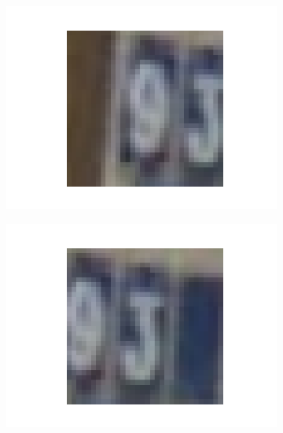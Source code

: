 \documentclass[14pt,a4paper]{extarticle}
\begin{document}
\begin{figure}[htb]
\begin{subfigure}[b]{0.3\textwidth}
    \includegraphics[width=\textwidth]{../res/svhn/sample_6.png}
    \label{fig:svhn_sample_6}
  \end{subfigure}
  \hfill
  \begin{subfigure}[b]{0.3\textwidth}
    \includegraphics[width=\textwidth]{../res/svhn/sample_7.png}
    \label{fig:svhn_sample_7}
  \end{subfigure}
  \hfill
  \begin{subfigure}[b]{0.3\textwidth}

\end{subfigure}
\end{figure}
\end{document}
